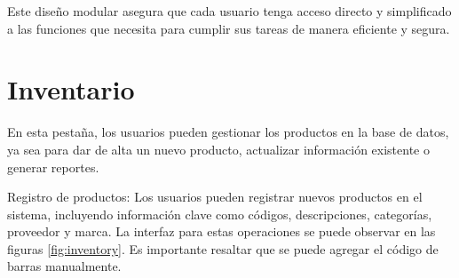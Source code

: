 Este diseño modular asegura que cada usuario tenga acceso directo y simplificado a las funciones que necesita para cumplir sus tareas de manera eficiente y segura. 

 

\section{Inventario}
\begin{justify}
En esta pestaña, los usuarios pueden gestionar los productos en la base de datos, ya sea para dar de alta un nuevo producto, actualizar información existente o generar reportes.
\end{justify}
\begin{justify}
Registro de productos: Los usuarios pueden registrar nuevos productos en el sistema, incluyendo información clave como códigos, descripciones, categorías, proveedor y marca. La interfaz para estas operaciones se puede observar en las figuras \ref{fig:inventory}. Es importante resaltar que se puede agregar el código de barras manualmente. 
\end{justify}

